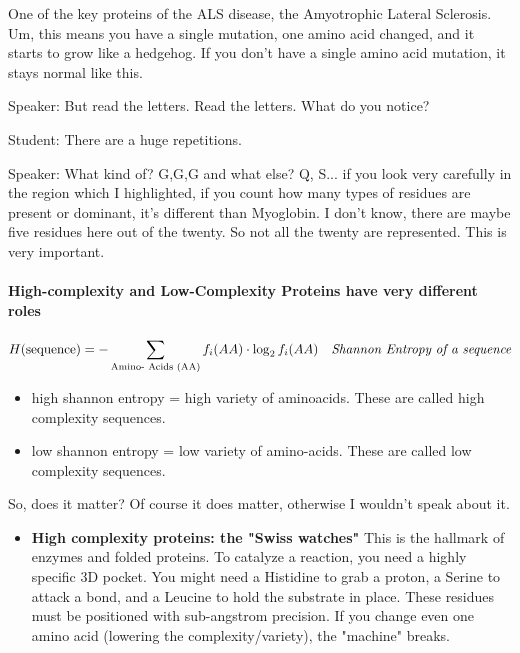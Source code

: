 \begin{itemize}
One of the key proteins of the ALS disease, the Amyotrophic Lateral Sclerosis. Um, this means you have a single mutation, one amino acid changed, and it starts to grow like a hedgehog. If you don't have a single amino acid mutation, it stays normal like this. 

Speaker: But read the letters. Read the letters. What do you notice?

Student: There are a huge repetitions.

Speaker: What kind of? G,G,G and what else? Q, S... if you look very carefully in the region which I highlighted, if you count how many types of residues are present or dominant, it's different than Myoglobin. I don't know, there are maybe five residues here out of the twenty. So not all the twenty are represented. This is very important. 



\paragraph{High-complexity and Low-Complexity Proteins have very different roles}

\begin{equation}
    H(\text{sequence}) = - \sum_{\small \text{Amino- Acids (AA)}} f_i(AA) \cdot \log_2{f_i(AA)} \quad \textit{Shannon Entropy of a sequence}
\end{equation}

\begin{itemize}
    \item high shannon entropy = high variety of aminoacids. These are called high complexity sequences.
    \item low shannon entropy = low variety of amino-acids. These are called low complexity sequences.    
\end{itemize}

So, does it matter? Of course it does matter, otherwise I wouldn't speak about it. 
\begin{itemize}
    \item  \textbf{High complexity proteins: the "Swiss watches"}
     This is the hallmark of enzymes and folded proteins. To catalyze a reaction, you need a highly specific 3D pocket. You might need a Histidine to grab a proton, a Serine to attack a bond, and a Leucine to hold the substrate in place. These residues must be positioned with sub-angstrom precision. If you change even one amino acid (lowering the complexity/variety), the "machine" breaks.


\end{itemize}
\end{itemize}
